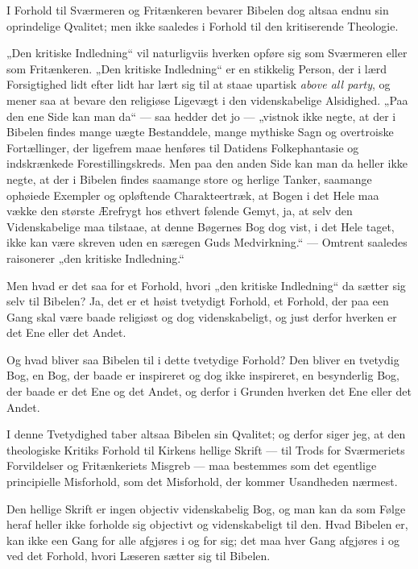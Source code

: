 \documentclass[12pt,a4paper]{book}
\newcommand{\opage}[1]{\marginnote{\footnotesize\textit{[#1]}}}
\begin{document}
\opage{39} I Forhold til Sværmeren og Fritænkeren bevarer Bibelen dog altsaa endnu sin
oprindelige Qvalitet; men ikke saaledes i Forhold til den kritiserende Theologie.

„Den kritiske Indledning“ vil naturligviis hverken opføre sig som Sværmeren
eller som Fritænkeren. „Den kritiske Indledning“ er en stikkelig Person, der i
lærd Forsigtighed lidt efter lidt har lært sig til at staae upartisk
\textit{above all party}, og mener saa at bevare den religiøse Ligevægt i den
videnskabelige Alsidighed. „Paa den ene Side kan man da“ --- saa hedder det jo
--- „vistnok ikke negte, at der i Bibelen findes mange uægte Bestanddele, mange
mythiske Sagn og overtroiske Fortællinger, der ligefrem maae henføres til
Datidens Folkephantasie og indskrænkede Forestillingskreds. Men paa den anden
Side kan man da heller ikke negte, at der i Bibelen findes saamange store og
herlige Tanker, saamange ophøiede Exempler og opløftende Charakteertræk, at
Bogen i det Hele maa vække den største Ærefrygt hos ethvert følende Gemyt, ja,
at selv den Videnskabelige maa tilstaae, at denne Bøgernes Bog dog vist, i det
Hele taget, ikke kan være skreven uden en særegen Guds Medvirkning.“ ---
Omtrent saaledes raisonerer „den kritiske Indledning.“

Men hvad er det saa for et Forhold, hvori „den kritiske Indledning“ da sætter
sig selv til Bibelen? Ja, det er et høist tvetydigt Forhold, et Forhold, der
paa een Gang skal være baade religiøst og dog videnskabeligt, og just derfor
hverken er det Ene eller det Andet.

Og hvad bliver saa Bibelen til i dette tvetydige Forhold? Den bliver en
tvetydig Bog, en Bog, der baade er inspireret og dog ikke inspireret, en
besynderlig Bog, der baade er det Ene og det Andet, og derfor i Grunden hverken
det Ene eller det Andet.

I denne Tvetydighed taber altsaa Bibelen sin Qvalitet; og derfor siger jeg, at
den theologiske Kritiks Forhold til Kirkens hellige Skrift --- til Trods for
Sværmeriets Forvildelser og Fritænkeriets
\opage{40} Misgreb --- maa bestemmes som det egentlige principielle Misforhold, som det
Misforhold, der kommer Usandheden nærmest.

Den hellige Skrift er ingen objectiv videnskabelig Bog, og man kan da som Følge
heraf heller ikke forholde sig objectivt og videnskabeligt til den. Hvad
Bibelen er, kan ikke een Gang for alle afgjøres i og for sig; det maa hver Gang
afgjøres i og ved det Forhold, hvori Læseren sætter sig til Bibelen.
\end{document}

